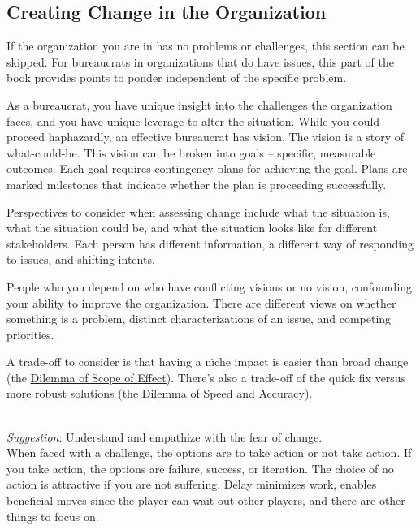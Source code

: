 \subsection*{Creating Change in the Organization\label{sec:creating-change}}

If the organization you are in has no problems or challenges, this section can be skipped. For bureaucrats in organizations that do have issues, this part of the book provides points to ponder independent of the specific problem.

As a bureaucrat, you have unique insight into the challenges the organization faces, and you have unique leverage to alter the situation.  While you could proceed haphazardly, an effective bureaucrat has vision. The vision is a story of what-could-be. This vision can be broken into goals -- specific, measurable outcomes. Each goal requires contingency plans for achieving the goal. Plans are marked milestones that indicate whether the plan is proceeding successfully. 

Perspectives to consider when assessing change include what the situation is, what the situation could be, and what the situation looks like for different stakeholders. Each person has different information, a different way of responding to issues, and shifting intents.

People who you depend on who have conflicting visions or no vision, confounding your ability to improve the organization. There are different views on whether something is a problem, distinct characterizations of an issue, and competing priorities.

A trade-off to consider is that having a n\"iche impact is easier than broad change (the \hyperref[table:dilemma-personal-scope-broad-vs-narrow]{Dilemma of Scope of Effect}). 
There's also a trade-off of the quick fix versus more robust solutions (the \hyperref[table:dilemma-personal-quick-methodical]{Dilemma of Speed and Accuracy}).




\ \\
\textit{Suggestion}: Understand and empathize with the fear of change. \\
When faced with a challenge, the options are to take action or not take action. If you take action, the options are failure, success, or iteration. 
The choice of no action is attractive if you are not suffering. Delay minimizes work, enables beneficial moves since the player can wait out other players, and there are other things to focus on.

